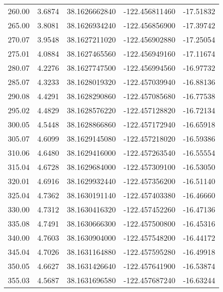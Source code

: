 \begin{longtable}{p{2.5cm}p{2.5cm}p{3cm}p{3cm}p{2.5cm}}
       260.00  & 	 3.6874 &               38.1626662840  &   -122.456811460   &	-17.51832 \\
       265.00  & 	 3.8081 &               38.1626934240  &   -122.456856900   &	-17.39742 \\
       270.07  & 	 3.9548 &               38.1627211020  &   -122.456902880   &	-17.25054 \\
       275.01  & 	 4.0884 &               38.1627465560  &   -122.456949160   &	-17.11674 \\
       280.07  & 	 4.2276 &               38.1627747500  &   -122.456994560   &	-16.97732 \\
       285.07  & 	 4.3233 &               38.1628019320  &   -122.457039940   &	-16.88136 \\
       290.08  & 	 4.4291 &               38.1628290860  &   -122.457085680   &	-16.77538 \\
       295.02  & 	 4.4829 &               38.1628576220  &   -122.457128820   &	-16.72134 \\
       300.05  & 	 4.5448 &               38.1628866860  &   -122.457172940   &	-16.65918 \\
       305.07  & 	 4.6099 &               38.1629145080  &   -122.457218020   &	-16.59386 \\
       310.06  & 	 4.6480 &               38.1629416000  &   -122.457263540   &	-16.55554 \\
       315.04  & 	 4.6728 &               38.1629684000  &   -122.457309100   &	-16.53050 \\
       320.01  & 	 4.6916 &               38.1629932440  &   -122.457356200   &	-16.51140 \\
       325.04  & 	 4.7362 &               38.1630191140  &   -122.457403380   &	-16.46660 \\
       330.00  & 	 4.7312 &               38.1630416320  &   -122.457452260   &	-16.47136 \\
       335.08  & 	 4.7491 &               38.1630666300  &   -122.457500800   &	-16.45316 \\
       340.00  & 	 4.7603 &               38.1630904000  &   -122.457548200   &	-16.44172 \\
       345.04  & 	 4.7026 &               38.1631164880  &   -122.457595280   &	-16.49918 \\
       350.05  & 	 4.6627 &               38.1631426640  &   -122.457641900   &	-16.53874 \\
       355.03  & 	 4.5687 &               38.1631696580  &   -122.457687240   &	-16.63244 \\

\end{longtable}
